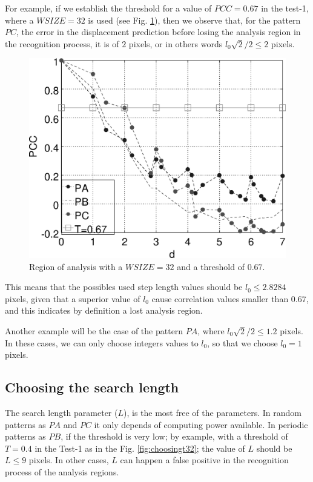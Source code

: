 For example, if we establish the threshold for a value of $PCC=0.67$ in the
test-1, where a $WSIZE=32$ is used
(see Fig. \ref{fig:choosingt32zoom}),
then we observe that, for the pattern $PC$, the error in the displacement prediction before
losing the analysis region in the recognition process, it is of $2$ pixels,
or in others words $l_0\sqrt{2}/2 \leq 2$ pixels.
\begin{figure}[H]
\centering
  \includegraphics[width=.7\columnwidth]{image_plot-32zoom.eps}
  \caption{Region of analysis with a $WSIZE=32$ and a threshold of $0.67$.}
  \label{fig:choosingt32zoom}
\end{figure}
This means that the possibles used step length values
should be $l_0 \leq 2.8284$ pixels, given that
a superior value of $l_0$ cause correlation values smaller than $0.67$,
and this indicates by definition a lost analysis region.

Another example will be the case of the pattern $PA$, where $l_0\sqrt{2}/2 \leq 1.2$ pixels.
In these cases, we can only choose integers values to $l_0$, so that we choose
$l_0=1$ pixels.

\subsection{Choosing the search length}

The search length parameter ($L$), is the most free of the parameters.
In random patterns as $PA$ and $PC$ it only depends of computing power available.
In periodic patterns as $PB$, if the threshold is very low; by example,
with a threshold of $T=0.4$ in the Test-1 as in the Fig. \ref{fig:choosingt32}; the
value of $L$ should be $L \leq 9$ pixels. In other cases, $L$ can happen a false positive
in the recognition process of the analysis regions.

